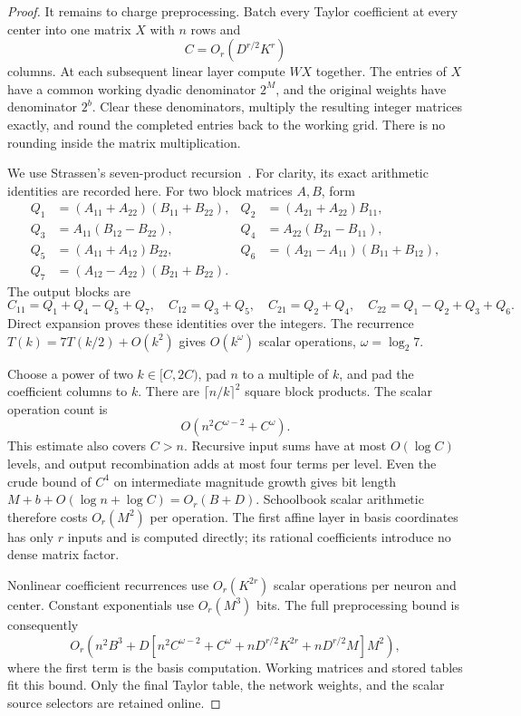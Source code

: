 \begin{proof}
It remains to charge preprocessing. Batch every Taylor coefficient
at every center into one matrix $X$ with $n$ rows and
\[
 C=O_r(D^{r/2}K^r)
\]
columns. At each subsequent linear layer compute $WX$ together.
The entries of $X$ have a common working dyadic denominator $2^M$,
and the original weights have denominator $2^b$. Clear these
denominators, multiply the resulting integer matrices exactly, and
round the completed entries back to the working grid. There is no
rounding inside the matrix multiplication.

We use Strassen's seven-product recursion~\cite{strassen1969}.
For clarity, its exact arithmetic identities are recorded here.
For two block matrices $A,B$, form
\begin{align*}
 Q_1&=(A_{11}+A_{22})(B_{11}+B_{22}),&
 Q_2&=(A_{21}+A_{22})B_{11},\\
 Q_3&=A_{11}(B_{12}-B_{22}),&
 Q_4&=A_{22}(B_{21}-B_{11}),\\
 Q_5&=(A_{11}+A_{12})B_{22},&
 Q_6&=(A_{21}-A_{11})(B_{11}+B_{12}),\\
 Q_7&=(A_{12}-A_{22})(B_{21}+B_{22}).
 \end{align*}
The output blocks are
\[
 C_{11}=Q_1+Q_4-Q_5+Q_7,\quad C_{12}=Q_3+Q_5,\quad
 C_{21}=Q_2+Q_4,\quad C_{22}=Q_1-Q_2+Q_3+Q_6.
\]
Direct expansion proves these identities over the integers. The
recurrence $T(k)=7T(k/2)+O(k^2)$ gives $O(k^\omega)$ scalar
operations, $\omega=\log_2 7$.

Choose a power of two $k\in[C,2C)$, pad $n$ to a multiple of
$k$, and pad the coefficient columns to $k$. There are
$\lceil n/k\rceil^2$ square block products. The scalar operation
count is
\[
 O\!\left(n^2C^{\omega-2}+C^\omega\right).
\]
This estimate also covers $C>n$. Recursive input sums have at most
$O(\log C)$ levels, and output recombination adds at most four
terms per level. Even the crude bound of $C^4$ on intermediate
magnitude growth gives bit length
$M+b+O(\log n+\log C)=O_r(B+D)$. Schoolbook scalar arithmetic
therefore costs $O_r(M^2)$ per operation. The first affine layer
in basis coordinates has only $r$ inputs and is computed directly;
its rational coefficients introduce no dense matrix factor.

Nonlinear coefficient recurrences use $O_r(K^{2r})$ scalar
operations per neuron and center. Constant exponentials use
$O_r(M^3)$ bits. The full preprocessing bound is consequently
\[
 O_r\!\left(n^2B^3+D\left[
 n^2C^{\omega-2}+C^\omega+
 nD^{r/2}K^{2r}+nD^{r/2}M\right]M^2\right),
\]
where the first term is the basis computation.
Working matrices and stored tables fit this bound. Only the final
Taylor table, the network weights, and the scalar source selectors
are retained online.


\end{proof}

